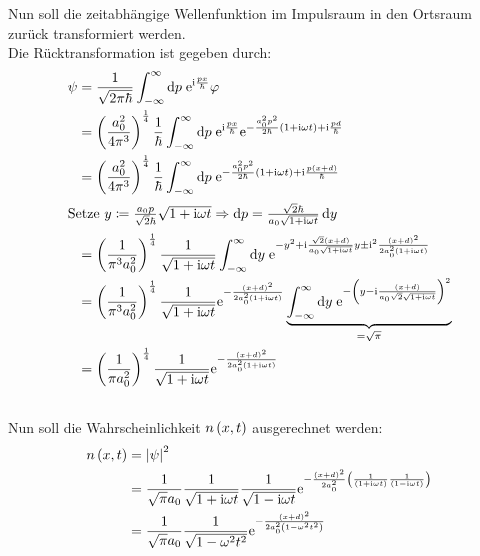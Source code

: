 \documentclass[11pt, ngerman, fleqn, DIV=15, headinclude]{scrartcl}
\begin{document}
Nun soll die zeitabhängige Wellenfunktion im Impulsraum in den Ortsraum zurück transformiert werden.\\
Die Rücktransformation ist gegeben durch:
\begin{align*}
	\psi	&= \frac1{\sqrt{2\pi\hbar}}\int_{-\infty}^{\infty}\dif p\;\eup^{\iup\frac{px}{\hbar}}\varphi\\
			&= \del{\frac{a_0^2}{4\pi^3}}^{\frac14}\frac1{\hbar}\int_{-\infty}^{\infty}\dif p\;\eup^{\iup\frac{px}{\hbar}}\eup^{-\frac{a_0^2p^2}{2\hbar}\del{1+\iup\omega t}+\iup\frac{pd}{\hbar}}\\
			&= \del{\frac{a_0^2}{4\pi^3}}^{\frac14}\frac1{\hbar}\int_{-\infty}^{\infty}\dif p\;\eup^{-\frac{a_0^2p^2}{2\hbar}\del{1+\iup\omega t}+\iup\frac{p\del{x+d}}{\hbar}}\\
	\intertext{%
		Setze $y\coloneqq\frac{a_0p}{\sqrt2\hbar}\sqrt{1+\iup\omega t}\Rightarrow \dif p=\frac{\sqrt2\hbar}{a_0\sqrt{1+\iup\omega t}}\dif y$
	}
			&= \del{\frac1{\pi^3a_0^2}}^{\frac14}\frac1{\sqrt{1+\iup\omega t}}\int_{-\infty}^{\infty}\dif y\;\eup^{-y^2+\iup\frac{\sqrt2\del{x+d}}{a_0\sqrt{1+\iup\omega t}}y\pm\iup^2\frac{\del{x+d}^2}{2a_0^2\del{1+\iup\omega t}}}\\
			&= \del{\frac1{\pi^3a_0^2}}^{\frac14}\frac1{\sqrt{1+\iup\omega t}}\eup^{-\frac{\del{x+d}^2}{2a_0^2\del{1+\iup\omega t}}}\underbrace{\int_{-\infty}^{\infty}\dif y\;\eup^{-\del{y-\iup\frac{\del{x+d}}{a_0\sqrt2\sqrt{1+\iup\omega t}}}^2}}_{=\sqrt{\pi}}\\
			&= \del{\frac1{\pi a_0^2}}^{\frac14}\frac1{\sqrt{1+\iup\omega t}}\eup^{-\frac{\del{x+d}^2}{2a_0^2\del{1+\iup\omega t}}}
\end{align*}

\subsection{}

Nun soll die Wahrscheinlichkeit $n\left( x,t \right)$ ausgerechnet werden:
\begin{align*}
	n\left( x,t \right)	&= \left| \psi \right|^2\\
				&= 	\frac1{\sqrt{\pi}a_0}\frac1{\sqrt{1+\mathrm i\omega t}}\frac1{\sqrt{1-\mathrm i\omega t}}\mathrm e^{-\frac{\left( x+d \right)^2}{2a_0^2}\left( \frac1{\left( 1+\mathrm i\omega t \right)}\frac1{\left( 1-\mathrm i\omega t \right)} \right)}\\
				&= 	\frac1{\sqrt{\pi}a_0}\frac1{\sqrt{1-\omega^2t^2}}\mathrm e^{-\frac{\left( x+d \right)^2}{2a_0^2\left( 1-\omega^2t^2 \right)}}\\	
\end{align*}
\end{document}
